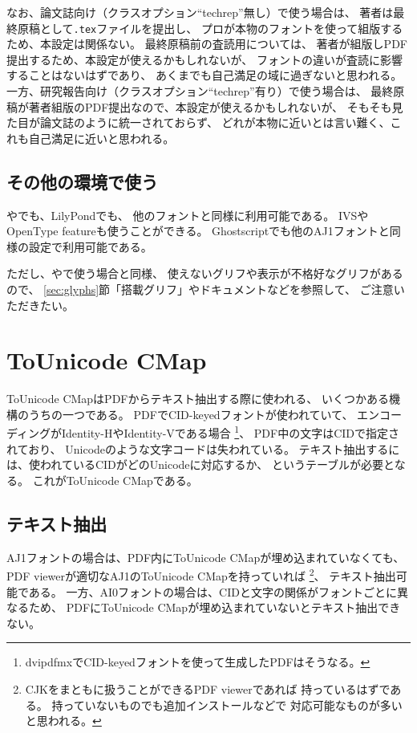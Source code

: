 なお、論文誌向け（クラスオプション``techrep''無し）で使う場合は、
著者は最終原稿として\texttt{\textcompwordmark .tex}ファイルを提出し、
プロが本物のフォントを使って組版するため、本設定は関係ない。
最終原稿前の査読用については、
著者が組版しPDF提出するため、本設定が使えるかもしれないが、
フォントの違いが査読に影響することはないはずであり、
あくまでも自己満足の域に過ぎないと思われる。
一方、研究報告向け（クラスオプション``techrep''有り）で使う場合は、
最終原稿が著者組版のPDF提出なので、本設定が使えるかもしれないが、
そもそも見た目が論文誌のように統一されておらず、
どれが本物に近いとは言い難く、これも自己満足に近いと思われる。

\subsection{その他の環境で使う}

\LuaTeX や\XeTeX でも、LilyPondでも、
他のフォントと同様に利用可能である。
IVSやOpenType featureも使うことができる。
Ghostscriptでも他のAJ1フォントと同様の設定で利用可能である。

ただし、\pTeX や\upTeX で使う場合と同様、
使えないグリフや表示が不格好なグリフがあるので、
\ref{sec:glyphs}節「搭載グリフ」やドキュメントなどを参照して、
ご注意いただきたい。

\section{ToUnicode CMap}

ToUnicode CMapはPDFからテキスト抽出する際に使われる、
いくつかある機構のうちの一つである。
PDFでCID-keyedフォントが使われていて、
エンコーディングがIdentity-HやIdentity-Vである場合
\footnote{dvipdfmxでCID-keyedフォントを使って生成したPDFはそうなる。}、
PDF中の文字はCIDで指定されており、
Unicodeのような文字コードは失われている。
テキスト抽出するには、使われているCIDがどのUnicodeに対応するか、
というテーブルが必要となる。
これがToUnicode CMapである。

\subsection{テキスト抽出}

AJ1フォントの場合は、PDF内にToUnicode CMapが埋め込まれていなくても、
PDF viewerが適切なAJ1のToUnicode CMapを持っていれば
\footnote{CJKをまともに扱うことができるPDF viewerであれば
  持っているはずである。
  持っていないものでも追加インストールなどで
  対応可能なものが多いと思われる。}、
テキスト抽出可能である。
一方、AI0フォントの場合は、CIDと文字の関係がフォントごとに異なるため、
PDFにToUnicode CMapが埋め込まれていないとテキスト抽出できない。

